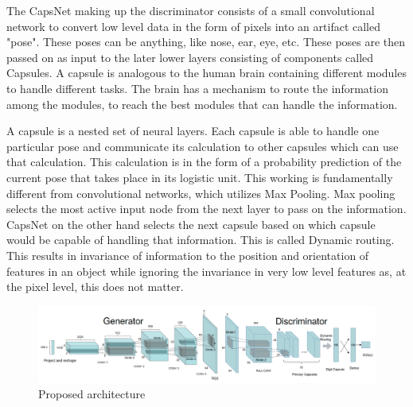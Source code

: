 \documentclass{vldb}
\begin{document}
The CapsNet making up the discriminator consists of a small convolutional network to convert low level data in the form of pixels into an artifact called "pose". These poses can be anything, like nose, ear, eye, etc. These poses are then passed on as input to the later lower layers consisting of components called Capsules. A capsule is analogous to the human brain containing different modules to handle different tasks. The brain has a mechanism to route the information among the modules, to reach the best modules that can handle the information.
\par\bigskip

A capsule is a nested set of neural layers. Each capsule is able to handle one particular pose and communicate its calculation to other capsules which can use that calculation. This calculation is in the form of a probability prediction of the current pose that takes place in its logistic unit. This working is fundamentally different from convolutional networks, which utilizes Max Pooling. Max pooling selects the most active input node from the next layer to pass on the information. CapsNet on the other hand selects the next capsule based on which capsule would be capable of handling that information. This is called Dynamic routing. This results in invariance of information to the position and orientation of features in an object while ignoring the invariance in very low level features as, at the pixel level, this does not matter.
\par\bigskip


\begin{figure}[H]
\centering\includegraphics[width=\linewidth]{../Final_Report/images/CapsDCGAN.png}
\caption{Proposed architecture}
\label{fig:capsgan}
\end{figure}
\end{document}
